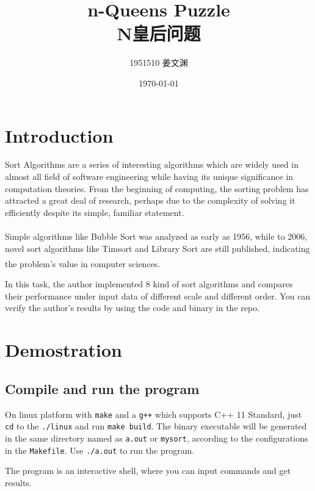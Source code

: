 \documentclass[cn,black,12pt,normal]{elegantnote}
\title{n-Queens Puzzle\\N皇后问题}
\author{1951510\; 姜文渊}
\institute{\small \url{https://github.com/jwyjohn/Jwy_DataStructureHomework}}
\date{\today}
\newcommand{\uct}[1]{\textsuperscript{\textsuperscript{\cite{#1}}}}
\begin{document}
\maketitle

\section{Introduction}

Sort Algorithms are a series of interesting algorithms which are widely used in almost all field of software engineering while having its unique significance in computation theories. From the beginning of computing, the sorting problem has attracted a great deal of research, perhaps due to the complexity of solving it efficiently despite its simple, familiar statement.

Simple algorithms like Bubble Sort was analyzed as early as 1956\uct{demuth1957electronic}, while to 2006, novel sort algorithms like Timsort and Library Sort are still published, indicating the problem's value in computer sciences.\uct{auger2015merge}

In this task, the author implemented 8 kind of sort algorithms and compares their performance under input data of different scale and different order. You can verify the author's results by using the code and binary in the repo.

\section{Demostration}

\subsection{Compile and run the program}

On linux platform with \lstinline{make} and a \lstinline{g++} which supports C++ 11 Standard, just \lstinline{cd} to the \lstinline{./linux} and run \lstinline{make build}. The binary executable will be generated in the same directory named as \lstinline{a.out} or \lstinline{mysort}, according to the configurations in the \lstinline{Makefile}. Use \lstinline{./a.out} to run the program.

The program is an interactive shell, where you can input commands and get results.
\end{document}
